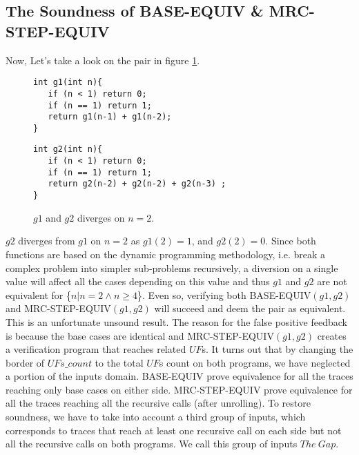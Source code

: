 \subsection{The Soundness of BASE-EQUIV \& MRC-STEP-EQUIV}
Now, Let's take a look on the pair in figure \ref{fig:g1g2neq}.
\begin{figure}[h]
\begin{center}
\begin{minipage}{7 cm}
\begin{lstlisting}
int g1(int n){
   if (n < 1) return 0;
   if (n == 1) return 1; 
   return g1(n-1) + g1(n-2);
}
\end{lstlisting}
\end{minipage}
\begin{minipage}{7 cm}
\begin{lstlisting}
int g2(int n){
   if (n < 1) return 0;
   if (n == 1) return 1; 
   return g2(n-2) + g2(n-2) + g2(n-3) ;
}
\end{lstlisting}
\end{minipage}
\caption{$g1$ and $g2$ diverges on $n=2$.}
\label{fig:g1g2neq}
\end{center}
\end{figure}
$g2$ diverges from $g1$ on $n=2$ as $g1(2) = 1$, and $g2(2) = 0$. Since both functions are based on the dynamic programming methodology, i.e. break a complex problem into simpler sub-problems recursively, a diversion on a single value will affect all the cases depending on this value and thus $g1$ and $g2$ are not equivalent for \{$n | n = 2 \wedge n \geq 4$\}. Even so, verifying both BASE-EQUIV$(g1,g2)$ and MRC-STEP-EQUIV$(g1,g2)$ will succeed and deem the pair as equivalent. This is an unfortunate unsound result. The reason for the false positive feedback is because the base cases are identical and MRC-STEP-EQUIV$(g1,g2)$ creates a verification program that reaches related $UF$s. It turns out that by changing the border of $UFs\_count$ to the total $UF$s count on both programs, we have neglected a portion of the inputs domain. BASE-EQUIV prove equivalence for all the traces reaching only base cases on either side. MRC-STEP-EQUIV prove equivalence for all the traces reaching all the recursive calls (after unrolling). To restore soundness, we have to take into account a third group of inputs, which corresponds to traces that reach at least one recursive call on each side but not all the recursive calls on both programs. We call this group of inputs $The\ Gap$.

